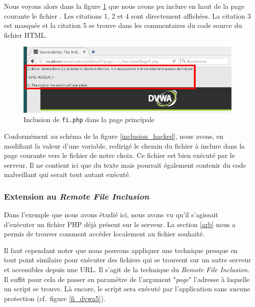 Nous voyons alors dans la figure \ref{fi_dvwa4} que nous avons pu inclure en haut de la page courante le fichier . Les citations 1, 2 et 4 sont directement affichées. La citation 3 est masquée et la citation 5 se trouve dans les commentaires du code source du fichier HTML.

\begin{figure}[!h]
\begin{center}
\includegraphics[scale=.6]{images/fi4_1.png}

\caption{Inclusion de \texttt{fi.php} dans la page principale}
\label{fi_dvwa4}
\end{center}
\end{figure}

Conformément au schéma de la figure \ref{inclusion_hacked}, nous avons, en modifiant la valeur d'une variable, redirigé le chemin du fichier à inclure dans la page courante vers le fichier de notre choix. Ce fichier  est bien exécuté par le serveur. Il ne contient ici que du texte mais pourrait également contenir du code malveillant qui serait tout autant exécuté.

\subsubsection{Extension au \textit{Remote File Inclusion}}

Dans l'exemple que nous avons étudié ici, nous avons vu qu'il s'agissait d'exécuter un fichier PHP déjà présent sur le serveur. La section \ref{arb} nous a permis de trouver comment accéder localement au fichier souhaité.

Il faut cependant noter que nous pouvons appliquer une technique presque en tout point similaire pour exécuter des fichiers qui se trouvent sur un autre serveur et accessibles depuis une URL. Il s'agit de la technique du \textit{Remote File Inclusion}. Il suffit pour cela de passer en paramètre de l'argument "\textit{page}" l'adresse à laquelle un script se trouve. Là encore, le script sera exécuté par l'application sans aucune protection (cf.\ figure \ref{fi_dvwa5}).

